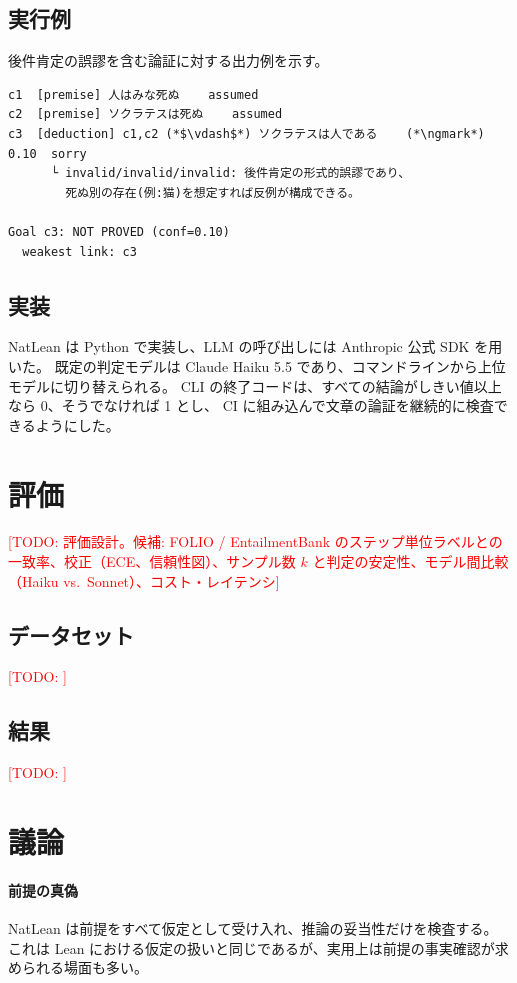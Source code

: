 \documentclass[a4paper,11pt]{ltjsarticle}
\newcommand{\ngmark}{\ding{55}}
\newcommand{\todo}[1]{\textcolor{red}{[TODO: #1]}}
\begin{document}
\subsection{実行例}

後件肯定の誤謬を含む論証に対する出力例を示す。

\begin{lstlisting}
c1  [premise] 人はみな死ぬ    assumed
c2  [premise] ソクラテスは死ぬ    assumed
c3  [deduction] c1,c2 (*$\vdash$*) ソクラテスは人である    (*\ngmark*) 0.10  sorry
      └ invalid/invalid/invalid: 後件肯定の形式的誤謬であり、
        死ぬ別の存在(例:猫)を想定すれば反例が構成できる。

Goal c3: NOT PROVED (conf=0.10)
  weakest link: c3
\end{lstlisting}

\subsection{実装}

NatLean は Python で実装し、LLM の呼び出しには Anthropic 公式 SDK を用いた。
既定の判定モデルは Claude Haiku 5.5 であり、コマンドラインから上位モデルに切り替えられる。
CLI の終了コードは、すべての結論がしきい値以上なら 0、そうでなければ 1 とし、
CI に組み込んで文章の論証を継続的に検査できるようにした。

\section{評価}

\todo{評価設計。候補: FOLIO / EntailmentBank のステップ単位ラベルとの一致率、校正（ECE、信頼性図）、サンプル数 $k$ と判定の安定性、モデル間比較（Haiku vs.\ Sonnet）、コスト・レイテンシ}

\subsection{データセット}
\todo{}

\subsection{結果}
\todo{}

\section{議論}

\paragraph{前提の真偽}
NatLean は前提をすべて仮定として受け入れ、推論の妥当性だけを検査する。
これは Lean における仮定の扱いと同じであるが、実用上は前提の事実確認が求められる場面も多い。
\end{document}
